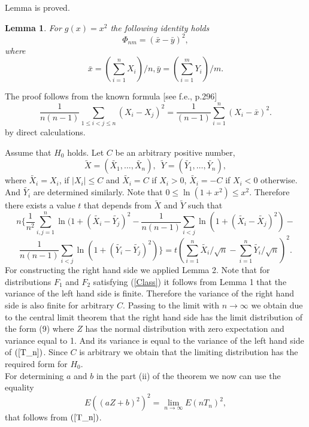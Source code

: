 \documentclass[final,11pt,3p]{elsarticle}
\newtheorem{lemma}{Lemma}
\begin{document}
Lemma is proved.

\begin{lemma} For $g(x)= x^2$ the following identity holds
$$
\Phi_{nm}= (\bar x - \bar y)^2,
$$
where
$$
\bar x = (\sum_{i=1}^n X_i)/n,
\bar y = (\sum_{i=1}^m Y_i)/m.
$$
\end{lemma}

The proof follows from the known formula [see f.e.\cite{Hoeffding}, p.296]
$$
\frac {1}{n(n-1)}\sum_{1\leq i<j\leq n
} (X_i-X_j)^2=\frac {1}{(n-1)} \sum_{i=1}^n (X_i - \bar x)^2.
$$
by  direct calculations.

Assume that $H_0$ holds. Let  $C$ be an arbitrary positive number,
$$
\tilde{X}=(\tilde{X_{1}},\ldots,\tilde{X_{n}}),\,\,\,
\tilde{Y}=(\tilde{Y_{1}},\ldots, \tilde{Y_{n}}),
$$
where $\tilde{X_{i}}=X_{i}$, if $
|X_{i}| \leq C$ and
 $\tilde{X_i}=C$ if $X_{i}>0$,
  $\tilde{X_i}=-C$ if $X_{i}<0$ otherwise. And $\tilde{Y_{i}}$ are determined similarly. Note that  $0 \leq \ln (1+x^2) \leq x^2$. Therefore there exists a value $t$ that depends from $\tilde{X}$ and $\tilde{Y}$ such that
\begin{equation}
n\{\frac{1}{n^2}\sum_{i,j=1}^n \ln(1 + (\tilde{X_{i}} - \tilde{Y_j})^2 -\frac{1}{n(n-1)}\sum_{i<j} \ln(1 + (\tilde{X_i} - \tilde{X_j})^2) -
\end{equation}
\begin{equation}\label{T_n}
 \frac{1}{n(n-1)}\sum_{i<j}  \ln(1 + (\tilde{Y_i} - \tilde{Y_j})^2)\}=
t
(\sum_{i=1}^n \tilde{X_{i}}/\sqrt{n}-\sum_{i=1}^n \tilde{Y_{i}}/\sqrt{n})^2.
\end{equation}
For constructing the right hand side we applied Lemma 2.
Note  that for distributions $F_1$ and $F_2$  satisfying (\ref{Class}) it follows from Lemma 1 that the variance of the left hand side is finite. Therefore the variance of the right hand side is also finite for arbitrary $C$.
Passing to the limit with $n\to \infty$ we obtain due to the central limit theorem that the right hand side has the limit distribution of the form (9) where  $Z$ has the normal distribution with zero expectation and variance equal to 1. And its variance  is equal to the variance of the left hand side  of $(\ref{T_n})$. Since $C$ is arbitrary we obtain that the limiting distribution has the required form for $H_0$. \\
 For determining $a$ and $b$ in the part (ii) of the theorem  we now can use the equality
 \begin{equation}\label{identity}
 E((aZ+b)^2)^2 =\lim_{n \to \infty}
 E(nT_n)^2,
 \end{equation}
 that follows from  $(\ref{T_n})$.
\end{document}
